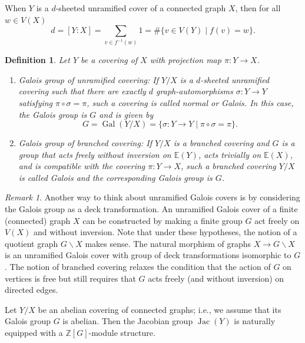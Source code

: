 \documentclass{amsart}
\newtheorem{definition}[theorem]{Definition}
\numberwithin{equation}{section}
\theoremstyle{remark}
\newtheorem{remark}[theorem]{Remark}
\newcommand{\Jac}{\operatorname{Jac}}
\newcommand{\Gal}{\operatorname{Gal}}
\newcommand{\Z}{\mathbb{Z}}
\newcommand{\E}{\mathbb{E}}
\theoremstyle{plain} %
\begin{document}
When $Y$ is a $d$-sheeted unramified cover of a connected graph $X$, then for all $w\in V(X)$
\[
d = [Y:X] =  \sum_{v\in f^{-1}(w)} 1 = \# \{v \in V(Y) \mid f(v) = w\}.
\]

\begin{definition}
{Let $Y$ be a covering of $X$ with projection map $\pi \colon Y \to X$.}
\begin{enumerate}
\item[\textup{(}i\textup{)}] \emph{Galois group of unramified covering:} If $Y/X$ is a $d$-sheeted \emph{unramified} covering %
such that there are exactly $d$ graph-automorphisms $\sigma \colon Y \rightarrow Y$ satisfying $\pi \circ \sigma = \pi$, {such a covering} is {called} \emph{normal} or \emph{Galois}.
In this case, the Galois group is $G$ and is given by
\[
G = \Gal(Y/X) = \{\sigma \colon Y \rightarrow Y \mid \pi \circ \sigma = \pi\}.
\]

\item[\textup{(}ii\textup{)}] \emph{Galois group of branched covering:}
If $Y/X$ is a \emph{branched} covering and $G$ is a group that acts freely without inversion on $\E(Y)$, acts trivially on $\E(X)$, and is compatible with the covering $\pi\colon Y\to X$, {such a branched covering} $Y/X$ is called \emph{Galois} {and the corresponding} Galois group is $G$.
\end{enumerate}
\end{definition}

\begin{remark}
{Another way to think about unramified Galois covers is by considering the Galois group as a deck transformation.
An unramified Galois cover of a finite (connected) graph $X$ can be constructed by making a finite group $G$ act freely on $V(X)$ and without inversion.
Note that under these hypotheses, the notion of a quotient graph $G\backslash X$ makes sense.
The natural morphism of graphs $X \to G\backslash X$ is an unramified Galois cover with group of deck transformations isomorphic to $G$.
The notion of branched covering relaxes the condition that the action of $G$ on vertices is free but still requires that $G$ acts freely (and without inversion) on directed edges.}
\end{remark}

Let $Y/X$ be an abelian covering of connected graphs; i.e., we assume that its Galois group $G$ is abelian.
Then the Jacobian group $\Jac(Y)$ is naturally equipped with a $\Z[G]$-module structure.
\end{document}
